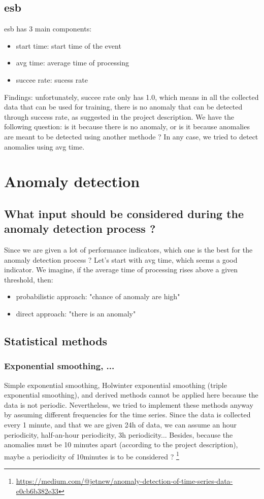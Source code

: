 \documentclass{article}
\begin{document}
    \subsection{esb}
    esb has 3 main components:
    \begin{itemize}
        \item start time: start time of the event
        \item avg time: average time of processing
        \item succee rate: sucess rate
    \end{itemize}
    Findings: unfortunately, succee rate only has 1.0, which means in all the collected data that can be used for training, there is no anomaly that can be detected through success rate, as suggested in the project description. We have the following question: is it because there is no anomaly, or is it because anomalies are meant to be detected using another methode ?
    In any case, we tried to detect anomalies using avg time. 

\section{Anomaly detection}
    \subsection{What input should be considered during the anomaly detection process ?}
    Since we are given a lot of performance indicators, which one is the best for the anomaly detection process ?
    Let's start with avg time, which seems a good indicator. We imagine, if the average time of processing rises above a given threshold, then: 
    \begin{itemize}
        \item probabilistic approach: "chance of anomaly are high"
        \item direct approach: "there is an anomaly"
    \end{itemize}

    \subsection{Statistical methods}
        \subsubsection{Exponential smoothing, ...}
            Simple exponential smoothing, Holwinter exponential smoothing (triple exponential smoothing), and derived methods cannot be applied here because the data is not periodic. 
            Nevertheless, we tried to implement these methods anyway by assuming different frequencies for the time series. Since the data is collected every 1 minute, and that we are given 24h of data, we can assume an hour periodicity, half-an-hour periodicity, 3h periodicity... Besides, because the anomalies must be 10 minutes apart (according to the project description), maybe a periodicity of 10minutes is to be considered ?
            \footnote{\url{https://medium.com/@jetnew/anomaly-detection-of-time-series-data-e0cb6b382e33}}
        
\end{document}
